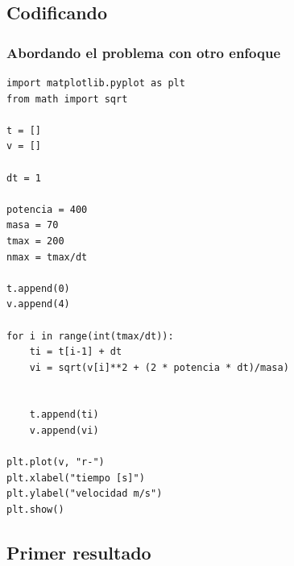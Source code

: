 \documentclass[12pt]{beamer}
\begin{document}
\subsection{Codificando}

\begin{frame}
\frametitle{Abordando el problema con otro enfoque}
\begin{lstlisting}[basicstyle=\linespread{1.2}\ttfamily\small, columns=fullflexible,escapeinside=||]
import matplotlib.pyplot as plt
from math import sqrt

t = []
v = []

dt = 1

potencia = 400
masa = 70
tmax = 200
nmax = tmax/dt

t.append(0)
v.append(4)

for i in range(int(tmax/dt)):
    ti = t[i-1] + dt
    vi = sqrt(v[i]**2 + (2 * potencia * dt)/masa)
    
    
    t.append(ti)
    v.append(vi)

plt.plot(v, "r-")
plt.xlabel("tiempo [s]")
plt.ylabel("velocidad m/s")
plt.show()
\end{lstlisting}
\end{frame}

\subsection{Primer resultado}
\end{document}
